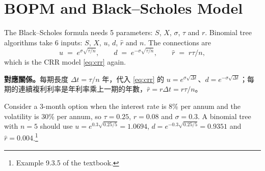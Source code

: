 \section{BOPM and Black--Scholes Model}
\label{sec:bopm-vs-bs}


The Black--Scholes formula needs 5 parameters: $S$, $X$, $\sigma$, $\tau$ and $r$.
Binomial tree algorithms take 6 inputs: $S$, $X$, $u$, $d$, $\hat{r}$ and $n$.
The connections are
\[
	u \;=\; e^{\sigma\sqrt{\tau/n}} ,
	\qquad
	d \;=\; e^{-\sigma\sqrt{\tau/n}} ,
	\qquad
	\hat{r} \;=\; r\tau/n ,
\]
which is the CRR model \eqref{eq:crr} again.

\suppstart
\begin{remark}
	\textbf{對應關係。}每期長度 $\Delta t=\tau/n$ 年，代入 \eqref{eq:crr} 的 $u=e^{\sigma\sqrt{\Delta t}}$、$d=e^{-\sigma\sqrt{\Delta t}}$；每期的連續複利利率是年利率乘上一期的年數，$\hat{r}=r\Delta t=r\tau/n$。
\end{remark}

\begin{eg}
	Consider a 3-month option when the interest rate is 8\% per annum and the volatility is 30\% per annum, so $\tau=0.25$, $r=0.08$ and $\sigma=0.3$.
	A binomial tree with $n=5$ should use $u=e^{0.3\sqrt{0.25/5}}=1.0694$, $d=e^{-0.3\sqrt{0.25/5}}=0.9351$ and $\hat{r}=0.004$.\footnote{Example 9.3.5 of the textbook.}
\end{eg}
\suppend


